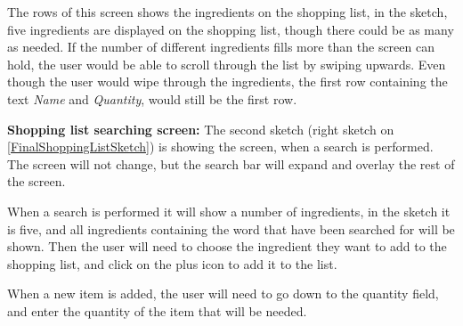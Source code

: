 The rows of this screen shows the ingredients on the shopping list, in the sketch, five ingredients are displayed on the shopping list, though there could be as many as needed. If the number of different ingredients fills more than the screen can hold, the user would be able to scroll through the list by swiping upwards. Even though the user would wipe through the ingredients, the first row containing the text \textit{Name} and \textit{Quantity}, would still be the first row.

\textbf{Shopping list searching screen:}
The second sketch (right sketch on \cref{FinalShoppingListSketch})  is showing the screen, when a search is performed. The screen will not change, but the search bar will expand and overlay the rest of the screen.

When a search is performed it will show a number of ingredients, in the sketch it is five, and all ingredients containing the word that have been searched for will be shown. Then the user will need to choose the ingredient they want to add to the shopping list, and click on the plus icon to add it to the list.

When a new item is added, the user will need to go down to the quantity field, and enter the quantity of the item that will be needed.